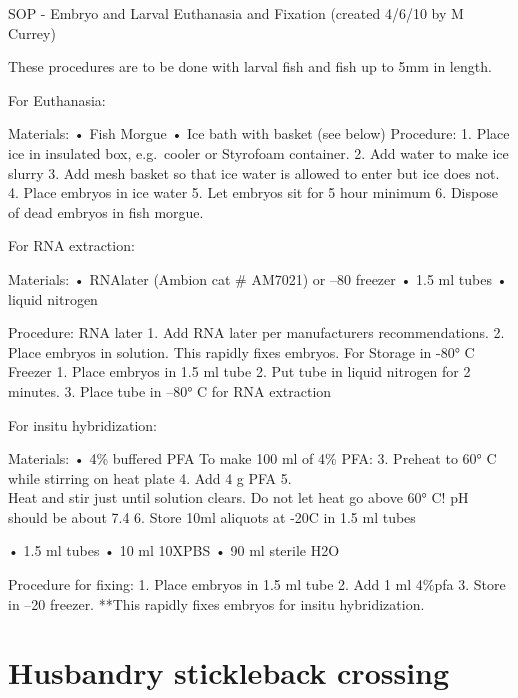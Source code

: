 \documentclass[
]{book}
\begin{document}
SOP - Embryo and Larval Euthanasia and Fixation
(created 4/6/10 by M Currey)

These procedures are to be done with larval fish and fish up to 5mm in length.

For Euthanasia:

Materials:
• Fish Morgue
• Ice bath with basket (see below)
Procedure:
1. Place ice in insulated box, e.g.~cooler or Styrofoam container.
2. Add water to make ice slurry
3. Add mesh basket so that ice water is allowed to enter but ice does not.
4. Place embryos in ice water
5. Let embryos sit for 5 hour minimum
6. Dispose of dead embryos in fish morgue.

For RNA extraction:

Materials:
• RNAlater (Ambion cat \# AM7021) or --80 freezer
• 1.5 ml tubes
• liquid nitrogen

Procedure:
RNA later
1. Add RNA later per manufacturers recommendations.
2. Place embryos in solution. This rapidly fixes embryos.
For Storage in -80° C Freezer
1. Place embryos in 1.5 ml tube
2. Put tube in liquid nitrogen for 2 minutes.
3. Place tube in --80° C for RNA extraction

For insitu hybridization:

Materials:
• 4\% buffered PFA
To make 100 ml of 4\% PFA:
3. Preheat to 60° C while stirring on heat plate
4. Add 4 g PFA
5.\\
Heat and stir just until solution clears. Do not let heat go above 60° C! pH should be about 7.4
6. Store 10ml aliquots at -20C in 1.5 ml tubes

• 1.5 ml tubes
• 10 ml 10XPBS
• 90 ml sterile H2O

Procedure for fixing:
1. Place embryos in 1.5 ml tube
2. Add 1 ml 4\%pfa
3. Store in --20 freezer.
**This rapidly fixes embryos for insitu hybridization.

\hypertarget{husbandry-stickleback-crossing-1}{%
\chapter{Husbandry stickleback crossing}\label{husbandry-stickleback-crossing-1}}
\end{document}
